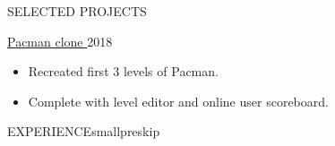 \documentclass{resume}
\begin{document}
\begin{minipage}[t]{0.54\textwidth}
\begin{rsection}{\MakeUppercase{selected projects}}{}
\begin{rcontent}{\href{https://github.com/solomspd/pacman}{Pacman clone \hspace{0.25em} \iconin{\faGithub}}}{2018}{}
\begin{techtag}
			\item {}
			\item {}
		\end{techtag}
			\begin{itemize}
				\item Recreated first 3 levels of Pacman.
				\item Complete with level editor and online user scoreboard.
			\end{itemize}
		\end{rcontent}

	\end{rsection}

\end{minipage}
\hfill
\begin{minipage}[t]{0.44\textwidth}

	\begin{rsection}{\MakeUppercase{experience}}{smallpreskip}


\end{rsection}
\end{minipage}
\end{document}
